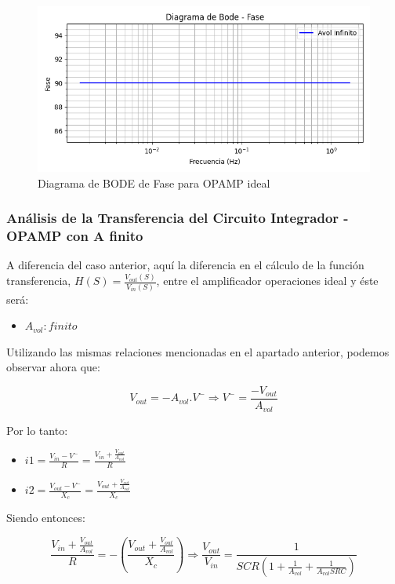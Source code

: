 \begin{figure}[H]
    \centering 
    \includegraphics [scale=1] {../Ejercicio3-CircuitoIntegradoresyDerivadores/Imagenes/diagrama-bode-ideal-fase.png} 
    \caption{Diagrama de BODE de Fase para OPAMP ideal}
    \label{fig:emptyPlotTool}
\end{figure}

\subsubsection{Análisis de la Transferencia del Circuito Integrador - OPAMP con A finito}

A diferencia del caso anterior, aquí la diferencia en el cálculo de la función transferencia, $H(S) = \frac{V_{out} (S)}{V_{in} (S)}$,
entre el amplificador operaciones ideal y éste será:

\begin{itemize}
	\item $A_{vol}: finito$
\end{itemize}

Utilizando las mismas relaciones mencionadas en el apartado anterior, podemos observar ahora que:


$$V_{out}=-A_{vol}.V^{-} \Longrightarrow V^{-} = \frac{-V_{out}}{A_{vol}}$$ 


Por lo tanto:

\begin{itemize}
	\item $i1 = \frac {V_{in}-V^{-}}{R} =  \frac {V_{in} + \frac{V_{out}}{A_{vol}}}{R}$
	\item $i2 = \frac {V_{out}-V^{-}}{X_c} = \frac {V_{out} + \frac{V_{out}}{A_{vol}}}{X_c}$
\end{itemize}

Siendo entonces:

$$ \frac {V_{in} + \frac{V_{out}}{A_{vol}}}{R} = -(\frac {V_{out} + \frac{V_{out}}{A_{vol}}}{X_c})
\Longrightarrow \frac{V_{out}}{V_{in}} = \frac{1}{SCR(1+\frac{1}{A_{vol}}+\frac{1}{A_{vol}SRC})}$$

